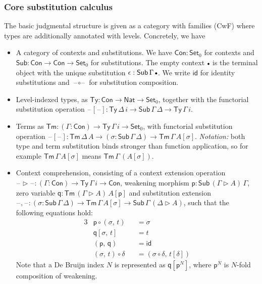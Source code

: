 \documentclass[acmsmall,screen,review,anonymous]{acmart}
\newcommand{\msf}[1]{{\mathsf{#1}}}
\newcommand{\p}{\mathsf{p}}
\newcommand{\q}{\mathsf{q}}
\newcommand{\Set}{\msf{Set}}
\newcommand{\Nat}{\msf{Nat}}
\newcommand{\blank}{{\mathord{\hspace{1pt}\text{--}\hspace{1pt}}}}
\newcommand{\emptycon}{\scaleobj{.75}\bullet}
\newcommand{\id}{\msf{id}}
\newcommand{\Con}{\msf{Con}}
\newcommand{\Sub}{\msf{Sub}}
\newcommand{\Ty}{\msf{Ty}}
\newcommand{\Tm}{\msf{Tm}}
\newcommand{\ext}{\triangleright}
\begin{document}
\subsubsection{Core substitution calculus} The basic judgmental structure is given
as a category with families (CwF) \cite{Dybjer96internaltype,cwfs} where types are additionally annotated with levels.
Concretely, we have
\begin{itemize}
\item A category of contexts and substitutions. We have $\Con : \Set_0$ for contexts and $\Sub : \Con \to \Con \to \Set_0$
  for substitutions. The empty context $\emptycon$ is the terminal object with the unique substitution $\epsilon : \Sub\,\Gamma\,\emptycon$.
  We write $\id$ for identity substitutions and $\blank\!\circ\!\blank$ for substitution composition.
\item Level-indexed types, as $\Ty : \Con \to \Nat \to \Set_0$, together with the functorial substitution operation
      $\blank[\blank] : \Ty\,\Delta\,i \to \Sub\,\Gamma\,\Delta \to \Ty\,\Gamma\,i$.
\item Terms as $\Tm : (\Gamma : \Con) \to \Ty\,\Gamma\,i \to \Set_0$, with functorial substitution operation
  $\blank[\blank] : \Tm\,\Delta\,A \to (\sigma : \Sub\,\Gamma\,\Delta) \to \Tm\,\Gamma\,A[\sigma]$.
  \emph{Notation:} both type and term substitution binds stronger than function application, so
  for example $\Tm\,\Gamma\,A[\sigma]$ means $\Tm\,\Gamma\,(A[\sigma])$.
\item Context comprehension, consisting of a context extension operation $\blank\!\ext\!\blank : (\Gamma : \Con) \to \Ty\,\Gamma\,i \to \Con$,
  weakening morphism $\p : \Sub\,(\Gamma\ext A)\,\Gamma$, zero variable $\q : \Tm\,(\Gamma\ext A)\,A[\p]$ and substitution extension $\blank,\!\blank : (\sigma : \Sub\,\Gamma\,\Delta) \to \Tm\,\Gamma\,A[\sigma] \to \Sub\,\Gamma\,(\Delta\ext A)$, such that the following equations hold:
  \begin{alignat*}{3}
    &\p \circ (\sigma,\,t)     &&= \sigma \\
    &\q[\sigma,\,t]            &&= t \\
    &(\p,\,\q)                 &&= \id \\
    &(\sigma,\,t) \circ \delta &&= (\sigma \circ \delta,\,t[\delta])
  \end{alignat*}
  Note that a De Bruijn index $N$ is represented as $\q[\p^N]$, where $\p^N$ is $N$-fold composition
  of weakening.
\end{itemize}
\end{document}

